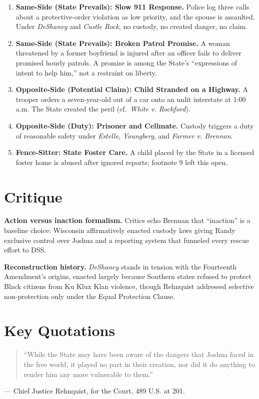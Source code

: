 \documentclass[12pt]{article}
\begin{document}
\begin{enumerate}
\item \textbf{Same-Side (State Prevails): Slow 911 Response.} Police log three calls about a protective-order violation as low priority, and the spouse is assaulted. Under \textit{DeShaney} and \textit{Castle Rock}, no custody, no created danger, no claim.
\item \textbf{Same-Side (State Prevails): Broken Patrol Promise.} A woman threatened by a former boyfriend is injured after an officer fails to deliver promised hourly patrols. A promise is among the State's ``expressions of intent to help him,'' not a restraint on liberty.
\item \textbf{Opposite-Side (Potential Claim): Child Stranded on a Highway.} A trooper orders a seven-year-old out of a car onto an unlit interstate at 1:00 a.m. The State created the peril (cf.\ \textit{White v. Rochford}).
\item \textbf{Opposite-Side (Duty): Prisoner and Cellmate.} Custody triggers a duty of reasonable safety under \textit{Estelle}, \textit{Youngberg}, and \textit{Farmer v. Brennan}.
\item \textbf{Fence-Sitter: State Foster Care.} A child placed by the State in a licensed foster home is abused after ignored reports; footnote 9 left this open.
\end{enumerate}

\section{Critique}

\textbf{Action versus inaction formalism.} Critics echo Brennan that ``inaction'' is a baseline choice: Wisconsin affirmatively enacted custody laws giving Randy exclusive control over Joshua and a reporting system that funneled every rescue effort to DSS.

\textbf{Reconstruction history.} \textit{DeShaney} stands in tension with the Fourteenth Amendment's origins, enacted largely because Southern states refused to protect Black citizens from Ku Klux Klan violence, though Rehnquist addressed selective non-protection only under the Equal Protection Clause.

\section{Key Quotations}

\begin{quote}
``While the State may have been aware of the dangers that Joshua faced in the free world, it played no part in their creation, nor did it do anything to render him any more vulnerable to them.''
\end{quote}
\noindent --- Chief Justice Rehnquist, for the Court, 489 U.S. at 201.
\end{document}
